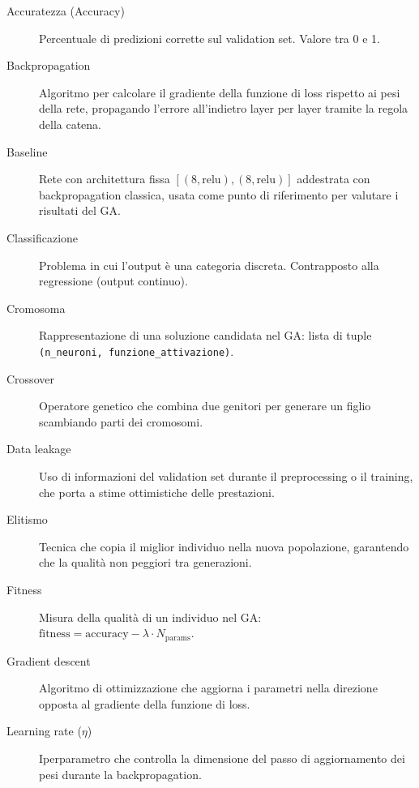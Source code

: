 \documentclass[12pt, a4paper]{article}
\begin{document}
\begin{description}
    \item[Accuratezza (Accuracy)] Percentuale di predizioni corrette sul
        validation set. Valore tra 0 e 1.

    \item[Backpropagation] Algoritmo per calcolare il gradiente della funzione
        di loss rispetto ai pesi della rete, propagando l'errore all'indietro
        layer per layer tramite la regola della catena.

    \item[Baseline] Rete con architettura fissa $[(8,\text{relu}),(8,\text{relu})]$
        addestrata con backpropagation classica, usata come punto di riferimento
        per valutare i risultati del GA.

    \item[Classificazione] Problema in cui l'output è una categoria discreta.
        Contrapposto alla regressione (output continuo).

    \item[Cromosoma] Rappresentazione di una soluzione candidata nel GA:
        lista di tuple \texttt{(n\_neuroni, funzione\_attivazione)}.

    \item[Crossover] Operatore genetico che combina due genitori per generare
        un figlio scambiando parti dei cromosomi.

    \item[Data leakage] Uso di informazioni del validation set durante il
        preprocessing o il training, che porta a stime ottimistiche delle prestazioni.

    \item[Elitismo] Tecnica che copia il miglior individuo nella nuova
        popolazione, garantendo che la qualità non peggiori tra generazioni.

    \item[Fitness] Misura della qualità di un individuo nel GA:
        $\text{fitness} = \text{accuracy} - \lambda \cdot N_{\text{params}}$.

    \item[Gradient descent] Algoritmo di ottimizzazione che aggiorna i
        parametri nella direzione opposta al gradiente della funzione di loss.

    \item[Learning rate ($\eta$)] Iperparametro che controlla la dimensione
        del passo di aggiornamento dei pesi durante la backpropagation.


\end{description}
\end{document}
